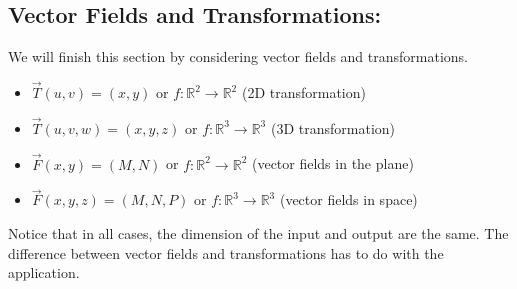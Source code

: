 \documentclass[10pt,]{book}
\theoremstyle{plain}
\theoremstyle{definition}
\theoremstyle{definition}
\theoremstyle{definition}
\theoremstyle{definition}
\theoremstyle{definition}
\numberwithin{equation}{section}
\begin{document}
\subsection[{Vector Fields and Transformations:}]{Vector Fields and Transformations:}\label{subsection-26}
We will finish this section by considering vector fields and transformations. \leavevmode%
\begin{itemize}[label=\textbullet]
\item{}\(\vec T(u,v)=(x,y)\) or \(f\colon \mathbb{R}^2\to\mathbb{R}^2\) (2D transformation)%
\item{}\(\vec T(u,v,w)=(x,y,z)\) or \(f\colon \mathbb{R}^3\to\mathbb{R}^3\) (3D transformation)%
\item{}\(\vec F(x,y)=(M,N)\) or \(f\colon \mathbb{R}^2\to\mathbb{R}^2\) (vector fields in the plane)%
\item{}\(\vec F(x,y,z)=(M,N,P)\) or \(f\colon \mathbb{R}^3\to\mathbb{R}^3\) (vector fields in space)%
\end{itemize}
%
\par
Notice that in all cases, the dimension of the input and output are the same. The difference between vector fields and transformations has to do with the application.%
\typeout{************************************************}
\typeout{************************************************}
\end{document}

